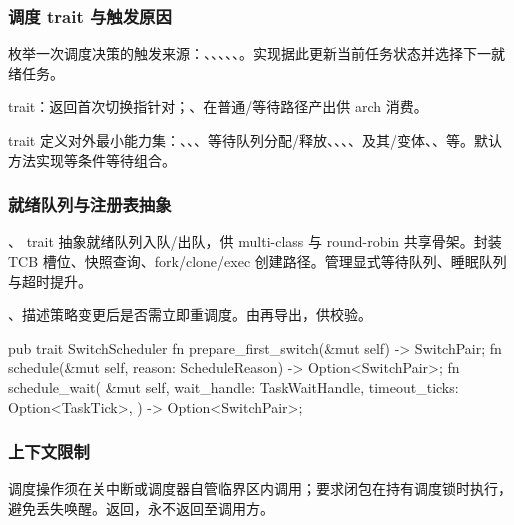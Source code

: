 
\subsubsection{调度 trait 与触发原因}

枚举一次调度决策的触发来源：、、、、、。实现据此更新当前任务状态并选择下一就绪任务。

 trait：返回首次切换指针对；、在普通/等待路径产出供 arch 消费。

 trait 定义对外最小能力集：、、、等待队列分配/释放、、、、及其/变体、、等。默认方法实现等条件等待组合。

\subsubsection{就绪队列与注册表抽象}

、 trait 抽象就绪队列入队/出队，供 multi-class 与 round-robin 共享骨架。封装 TCB 槽位、快照查询、fork/clone/exec 创建路径。管理显式等待队列、睡眠队列与超时提升。

、描述策略变更后是否需立即重调度。由再导出，供校验。

\begin{rustcode}
pub trait SwitchScheduler {
    fn prepare_first_switch(&mut self) -> SwitchPair;
    fn schedule(&mut self, reason: ScheduleReason) -> Option<SwitchPair>;
    fn schedule_wait(
        &mut self, wait_handle: TaskWaitHandle,
        timeout_ticks: Option<TaskTick>,
    ) -> Option<SwitchPair>;
}
\end{rustcode}

\subsubsection{上下文限制}

调度操作须在关中断或调度器自管临界区内调用；要求闭包在持有调度锁时执行，避免丢失唤醒。返回\code{!}，永不返回至调用方。
